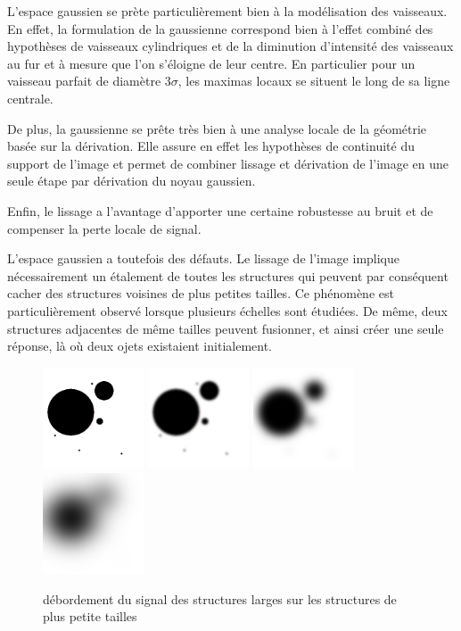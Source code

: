 {L'espace gaussien se prète particulièrement bien à la modélisation des vaisseaux. En effet, la formulation de la gaussienne correspond bien à l'effet combiné des hypothèses de vaisseaux cylindriques et de la diminution d'intensité des vaisseaux au fur et à mesure que l'on s'éloigne de leur centre. En particulier pour un vaisseau parfait de diamètre $3\sigma$, les maximas locaux se situent le long de sa ligne centrale.

De plus, la gaussienne se prête très bien à une analyse locale de la géométrie basée sur la dérivation. Elle assure en effet les hypothèses de continuité du support de l'image et permet de combiner lissage et dérivation de l'image en une seule étape par dérivation du noyau gaussien.

Enfin, le lissage a l'avantage d'apporter une certaine robustesse au bruit et de compenser la perte locale de signal.

L'espace gaussien a toutefois des défauts. Le lissage de l'image implique nécessairement un étalement de toutes les structures qui peuvent par conséquent cacher des structures voisines de plus petites tailles. Ce phénomène est particulièrement observé lorsque plusieurs échelles sont étudiées. De même, deux structures adjacentes de même tailles peuvent fusionner, et ainsi créer une seule réponse, là où deux ojets existaient initialement.

\begin{figure}
  \centering
  \includegraphics[height=3cm]{Images/gaussian_spilling_init.png}
  \includegraphics[height=3cm]{Images/gaussian_spilling_g10.png}
  \includegraphics[height=3cm]{Images/gaussian_spilling_g40.png}
  \includegraphics[height=3cm]{Images/gaussian_spilling_g100.png}
  \label{fig:scale_space_spilling}
  \caption{débordement du signal des structures larges sur les structures de plus petite tailles}
\end{figure}



}
